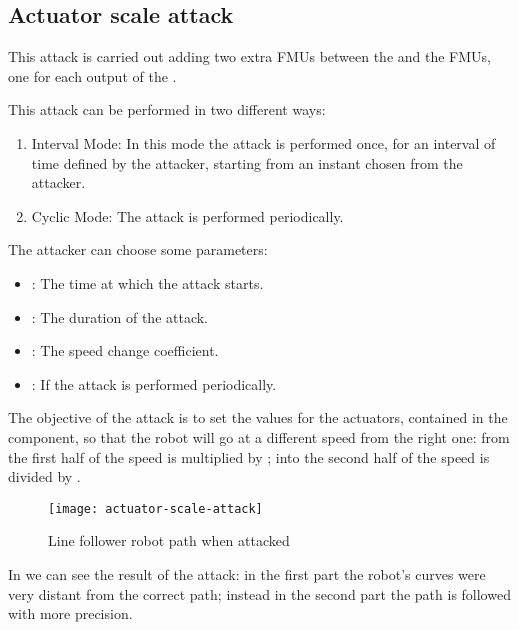 \subsection{Actuator scale attack}
This attack is carried out adding two extra FMUs between the 
and the  FMUs, one for each output of the .

This attack can be performed in two different ways:
\begin{enumerate}
	\item Interval Mode: In this mode the attack is performed once, for an
		interval of time defined by the attacker, starting from an
		instant chosen from the attacker.
	\item Cyclic Mode: The attack is performed periodically.
\end{enumerate}

The attacker can choose some parameters:
\begin{itemize}
	\item {}: The time at which the attack starts.
	\item {}: The duration of the attack.
	\item {}: The speed change coefficient.
	\item {}: If  the attack is performed
		periodically.
\end{itemize}

The objective of the attack is to set the values for the actuators, contained in
the  component, so that the robot will go at a different speed from
the right one: from the first half of  the speed is
multiplied by ; into the second half of
 the speed is divided by .



\begin{figure}[htb]
	\centering
	\texttt{[image: actuator-scale-attack]}
	\caption{Line follower robot path when
	attacked}\label{fig:actuatorscaleresult}
\end{figure}

In  we can see the result of the attack: in the
first part the robot's curves were very distant from the correct path; instead
in the second part the path is followed with more precision.
